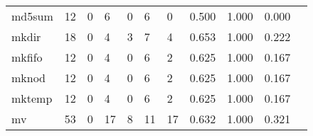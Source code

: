 \begin{longtable}{lp{1.20cm}p{1.20cm}p{1.20cm}p{1.20cm}p{1.20cm}p{1.20cm}p{1.20cm}p{1.20cm}p{1.20cm}p{1.20cm}}
md5sum    &                                    12 &                                                  0 &                                                  6 &                                                  0 &                                                  6 &                                                  0 &                                         0.500 &                                              1.000 &                                              0.000 \\
mkdir     &                                    18 &                                                  0 &                                                  4 &                                                  3 &                                                  7 &                                                  4 &                                         0.653 &                                              1.000 &                                              0.222 \\
mkfifo    &                                    12 &                                                  0 &                                                  4 &                                                  0 &                                                  6 &                                                  2 &                                         0.625 &                                              1.000 &                                              0.167 \\
mknod     &                                    12 &                                                  0 &                                                  4 &                                                  0 &                                                  6 &                                                  2 &                                         0.625 &                                              1.000 &                                              0.167 \\
mktemp    &                                    12 &                                                  0 &                                                  4 &                                                  0 &                                                  6 &                                                  2 &                                         0.625 &                                              1.000 &                                              0.167 \\
mv        &                                    53 &                                                  0 &                                                 17 &                                                  8 &                                                 11 &                                                 17 &                                         0.632 &                                              1.000 &                                              0.321 \\

\end{longtable}
